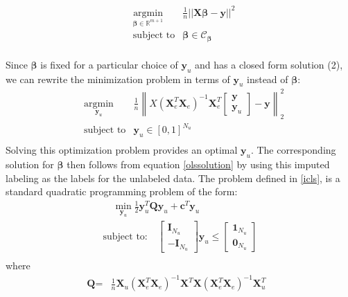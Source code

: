 \documentclass[smallcondensed]{svjour3}
\newcommand{\Xe}{\mathbf{X}_e  }
\newcommand{\XeT}{\mathbf{X}_e^T}
\newcommand{\ye}{\begin{bmatrix} \mathbf{y}  \\ \mathbf{y}_u \end{bmatrix}}
\newcommand{\G}{\left(\Xe^T \Xe \right)^{-1}}
\begin{document}
\begin{center}
\begin{equation}
\begin{aligned}
&\operatorname*{argmin}_{\boldsymbol{\beta} \in \mathbb{R}^{m+1}} & \frac{1}{n}  ||\mathbf{X} \boldsymbol{\beta}-\mathbf{y}||^2  \\
& \text{subject to} & \boldsymbol{\beta} \in \mathcal{C}_{\boldsymbol{\beta}}  \\
\end{aligned}
\end{equation}
\end{center}
Since $\boldsymbol{\beta}$ is fixed for a particular choice of $\textbf{y}_u$ and has a closed form solution (2), we can rewrite the minimization problem in terms of $\textbf{y}_u$ instead of $\boldsymbol{\beta}$:
\begin{equation} \label{icls}
\begin{aligned}
& \operatorname*{argmin}_{\mathbf{y}_u} & \frac{1}{n}  \left\|  X \left(\XeT \Xe \right)^{-1} \XeT \ye - \mathbf{y} \right\|_2^2 \\ 
& \text{subject to} & \mathbf{y}_u \in [0,1]^{N_u} \\
\end{aligned}
\end{equation}
Solving this optimization problem provides an optimal $\mathbf{y}_u$. The corresponding solution for $\boldsymbol{\beta}$ then follows from equation \eqref{olssolution} by using this imputed labeling as the labels for the unlabeled data. The problem defined in \eqref{icls}, is a standard quadratic programming problem of the form:
\begin{equation}
\begin{aligned}
& \quad \min_{\mathbf{y}_u} \frac{1}{2} \textbf{y}_u^T  \textbf{Q}  \textbf{y}_u + \textbf{c}^T \textbf{y}_u   & \\
& \text{subject to:}  \quad \begin{bmatrix} \textbf{I}_{N_u}  \\ -\textbf{I}_{N_u} \end{bmatrix}  \textbf{y}_u \leq \begin{bmatrix} \textbf{1}_{N_u}  \\ \textbf{0}_{N_u} \end{bmatrix} & \\
\end{aligned}
\end{equation}
where
\begin{equation}
\begin{aligned}
\textbf{Q} = & \frac{1}{n}  \textbf{X}_u \G \textbf{X}^T \textbf{X} \G \textbf{X}_u^T &\\
\end{aligned} \nonumber
\end{equation}
\end{document}
